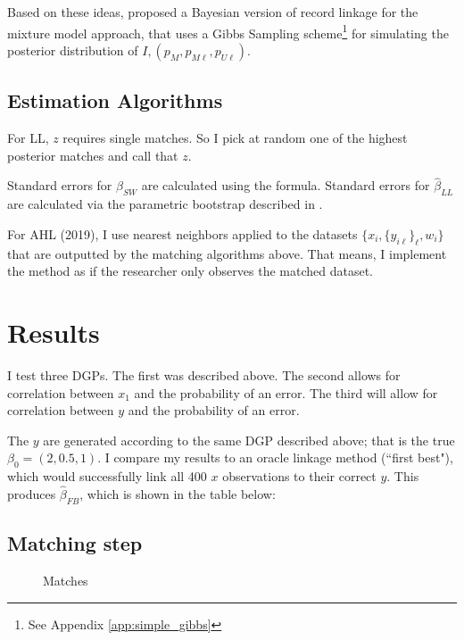 \documentclass[12pt]{article}
\newcommand\params{(p_M, p_{M\ell}, p_{U\ell})}
\begin{document}
\begin{enumerate}
Based on these ideas, \cite{larsen_rubin_2001} proposed a Bayesian version of record linkage for the mixture model approach, that uses a Gibbs Sampling scheme\footnote{See Appendix \ref{app:simple_gibbs}} for simulating the posterior distribution of $I,\params$. 



\subsection{Estimation Algorithms}  

For LL, $z$ requires single matches.  So I pick at random one of the highest posterior matches and call that $z$. 

Standard errors for $\hat{\beta}_{SW}$ are calculated using the formula. 
Standard errors for $\hat{\beta}_{LL}$ are calculated via the parametric bootstrap described in \cite{lahiri05}.  


For AHL (2019), I use nearest neighbors applied to the datasets $\{x_i, \{y_{i\ell}\}_\ell, w_i \}$ that are outputted by the matching algorithms above.  That means, I implement the method as if the researcher only observes the matched dataset.  

\section{Results}
I test three DGPs. The first was described above.  The second allows for correlation  between $x_1$ and the probability of an error.  The third will allow for correlation between $y$ and the probability of an error. 

The $y$ are generated according to the same DGP described above; that is the true $\beta_0 = (2, 0.5, 1)$.  I compare my results to an oracle linkage method (``first best"), which would successfully link all 400 $x$ observations to their correct $y$.  This produces $\hat{\beta}_{FB}$, which is shown in the table below:



\subsection{Matching step}
\begin{figure}[htbp]
\caption{Matches}
\begin{center}


\label{default}
\end{center}
\end{figure}


\end{enumerate}
\end{document}
